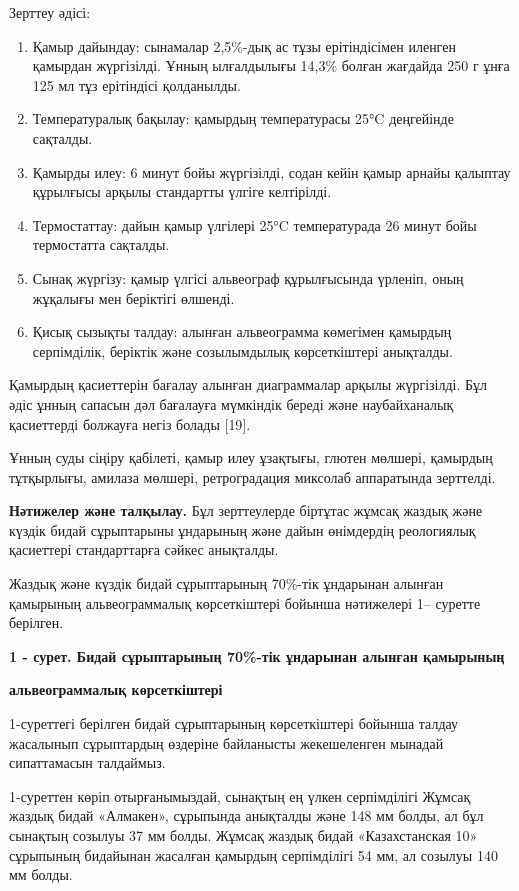 {{Зерттеу әдісі:

\begin{enumerate}
\def\labelenumi{\arabic{enumi}.}
\item
  Қамыр дайындау: сынамалар 2,5\%-дық ас тұзы ерітіндісімен иленген
  қамырдан жүргізілді. Ұнның ылғалдылығы 14,3\% болған жағдайда 250 г
  ұнға 125 мл тұз ерітіндісі қолданылды.
\item
  Температуралық бақылау: қамырдың температурасы 25°C деңгейінде
  сақталды.
\item
  Қамырды илеу: 6 минут бойы жүргізілді, содан кейін қамыр арнайы
  қалыптау құрылғысы арқылы стандартты үлгіге келтірілді.
\item
  Термостаттау: дайын қамыр үлгілері 25°C температурада 26 минут бойы
  термостатта сақталды.
\item
  Сынақ жүргізу: қамыр үлгісі альвеограф құрылғысында үрленіп, оның
  жұқалығы мен беріктігі өлшенді.
\item
  Қисық сызықты талдау: алынған альвеограмма көмегімен қамырдың
  серпімділік, беріктік және созылымдылық көрсеткіштері анықталды.
\end{enumerate}

Қамырдың қасиеттерін бағалау алынған диаграммалар арқылы жүргізілді. Бұл
әдіс ұнның сапасын дәл бағалауға мүмкіндік береді және наубайханалық
қасиеттерді болжауға негіз болады {[}19{]}.

Ұнның суды сіңіру қабілеті, қамыр илеу ұзақтығы, глютен мөлшері,
қамырдың тұтқырлығы, амилаза мөлшері, ретроградация миксолаб аппаратында
зерттелді.

{\bfseries Нәтижелер және талқылау.} Бұл зерттеулерде біртұтас жұмсақ
жаздық және күздік бидай сұрыптарыны ұндарының және дайын өнімдердің
реологиялық қасиеттері стандарттарға сәйкес анықталды.

Жаздық және күздік бидай сұрыптарының 70\%-тік ұндарынан алынған
қамырының альвеограммалық көрсеткіштері бойынша нәтижелері 1-- суретте
берілген.

{\bfseries 1 - сурет. Бидай сұрыптарының 70\%-тік ұндарынан алынған
қамырының}

{\bfseries альвеограммалық көрсеткіштері}

1-суреттегі берілген бидай сұрыптарының көрсеткіштері бойынша талдау
жасалынып сұрыптардың өздеріне байланысты жекешеленген мынадай
сипаттамасын талдаймыз.

1-суреттен көріп отырғанымыздай, сынақтың ең үлкен серпімділігі Жұмсақ
жаздық бидай «Алмакен», сұрыпында анықталды және 148 мм болды, ал бұл
сынақтың созылуы 37 мм болды. Жұмсақ жаздық бидай «Казахстанская 10»
сұрыпының бидайынан жасалған қамырдың серпімділігі 54 мм, ал созылуы 140
мм болды.

}}
